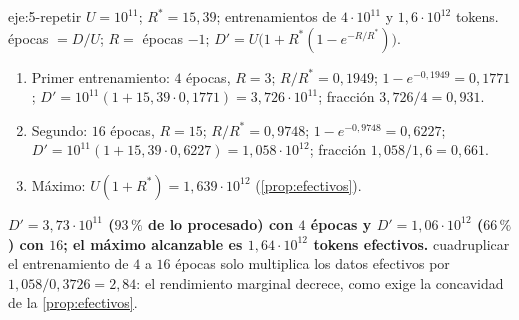 \begin{solucion}{eje:5-repetir}
\datos $U=10^{11}$; $R^{*}=15{,}39$; entrenamientos de $4\cdot 10^{11}$ y $1{,}6\cdot 10^{12}$ tokens.
\planteamiento épocas $=D/U$; $R=$ épocas $-1$; $D'=U\bigl(1+R^{*}(1-e^{-R/R^{*}})\bigr)$.
\pasos
\begin{enumerate}[label=\arabic*.]
  \item Primer entrenamiento: $4$ épocas, $R=3$; $R/R^{*}=0{,}1949$; $1-e^{-0{,}1949}=0{,}1771$; $D'=10^{11}(1+15{,}39\cdot 0{,}1771)=3{,}726\cdot 10^{11}$; fracción $3{,}726/4=0{,}931$.
  \item Segundo: $16$ épocas, $R=15$; $R/R^{*}=0{,}9748$; $1-e^{-0{,}9748}=0{,}6227$; $D'=10^{11}(1+15{,}39\cdot 0{,}6227)=1{,}058\cdot 10^{12}$; fracción $1{,}058/1{,}6=0{,}661$.
  \item Máximo: $U(1+R^{*})=1{,}639\cdot 10^{12}$ (\cref{prop:efectivos}).
\end{enumerate}
\resultado \textbf{$D'=3{,}73\cdot 10^{11}$ ($93\,\%$ de lo procesado) con $4$ épocas y $D'=1{,}06\cdot 10^{12}$ ($66\,\%$) con $16$; el máximo alcanzable es $1{,}64\cdot 10^{12}$ tokens efectivos.}
\comprobacion cuadruplicar el entrenamiento de $4$ a $16$ épocas solo multiplica los datos efectivos por $1{,}058/0{,}3726=2{,}84$: el rendimiento marginal decrece, como exige la concavidad de la \cref{prop:efectivos}.
\end{solucion}


